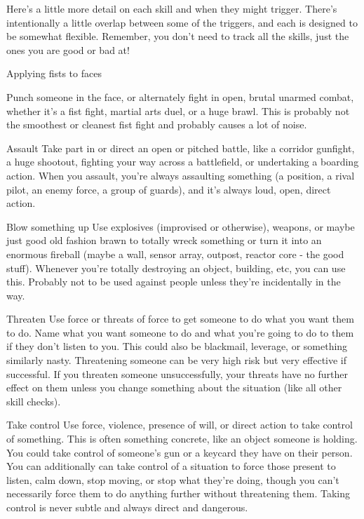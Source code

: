 Here’s a little more detail on each skill and when they might trigger. There’s intentionally a little
overlap between some of the triggers, and each is designed to be somewhat flexible.
Remember, you don’t need to track all the skills, just the ones you are good or bad at!


Applying fists to faces




Punch someone in the face, or alternately fight in open, brutal unarmed combat, whether it’s a fist
fight, martial arts duel, or a huge brawl. This is probably not the smoothest or cleanest fist fight
and probably causes a lot of noise.

Assault
Take part in or direct an open or pitched battle, like a corridor gunfight, a huge shootout, fighting
your way across a battlefield, or undertaking a boarding action. When you assault, you’re always
assaulting something (a position, a rival pilot, an enemy force, a group of guards), and it’s always
loud, open, direct action.

Blow something up
Use explosives (improvised or otherwise), weapons, or maybe just good old fashion brawn to
totally wreck something or turn it into an enormous fireball (maybe a wall, sensor array, outpost,
reactor core - the good stuff). Whenever you’re totally destroying an object, building, etc, you can
use this. Probably not to be used against people unless they’re incidentally in the way.

Threaten
Use force or threats of force to get someone to do what you want them to do. Name what you
want someone to do and what you’re going to do to them if they don’t listen to you. This could
also be blackmail, leverage, or something similarly nasty. Threatening someone can be very high
risk but very effective if successful. If you threaten someone unsuccessfully, your threats have no
further effect on them unless you change something about the situation (like all other skill checks).

Take control
Use force, violence, presence of will, or direct action to take control of something. This is often
something concrete, like an object someone is holding. You could take control of someone’s gun
or a keycard they have on their person. You can additionally can take control of a situation to force
those present to listen, calm down, stop moving, or stop what they’re doing, though you can’t
necessarily force them to do anything further without threatening them. Taking control is never
subtle and always direct and dangerous.

